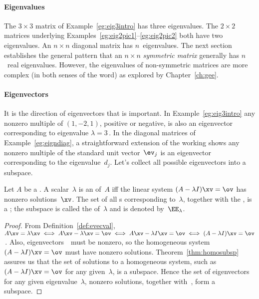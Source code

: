 \paragraph{Eigenvalues}
The \(3\times 3\) matrix of Example~\ref{eg:eig3intro} has three eigenvalues.
The \(2\times2\) matrices underlying Examples~\ref{eg:eig2pic1}--\ref{eg:eig2pic2} both have two eigenvalues.
An \(n\times n\) diagonal matrix has \(n\)~eigenvalues.
The next section establishes the general pattern that an \(n\times n\) \emph{symmetric matrix} generally has \(n\)~real eigenvalues.
However, the eigenvalues of non-symmetric matrices are more complex (in both senses of the word) as explored by Chapter~\ref{ch:gee}.

\paragraph{Eigenvectors}
It is the direction of eigenvectors that is important.
In Example~\ref{eg:eig3intro} any nonzero multiple of \((1,-2,1)\), positive or negative, is also an eigenvector corresponding to eigenvalue \(\lambda=3\)\,.
In the diagonal matrices of Example~\ref{eg:eigndiag}, a straightforward extension of the working shows any nonzero multiple of the standard unit vector~\(\ev_j\) is an eigenvector corresponding to the eigenvalue~\(d_j\).
Let's collect all possible eigenvectors into a subspace. 


\begin{theorem} \label{thm:espacedef} 
Let \(A\) be a . 
A scalar~\(\lambda\) is an  of~\(A\) iff the  linear system \((A-\lambda I)\xv=\ov\) has nonzero solutions~\(\xv\).  
The set of all s corresponding to~\(\lambda\), together with the , is a ; the subspace is called the  of~\(\lambda\) and is denoted by~\(\EE_\lambda\).
\end{theorem}

\begin{proof} 
From Definition~\ref{def:evecval},  \(A\xv=\lambda\xv \iff A\xv-\lambda\xv=\ov \iff A\xv-\lambda I\xv=\ov \iff (A-\lambda I)\xv=\ov\)\,.  
Also, eigenvectors~\xv\ must be nonzero, so the homogeneous system \((A-\lambda I)\xv=\ov\) must have nonzero solutions.
Theorem~\ref{thm:homosubsp} assures us that the set of solutions to a homogeneous system, such as \((A-\lambda I)\xv=\ov\) for any given~\(\lambda\), is a subspace. 
Hence the set of eigenvectors for any given eigenvalue~\(\lambda\), nonzero solutions, together with~\ov, form a subspace.
\end{proof}



